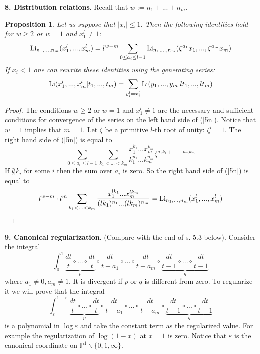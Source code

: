 \documentclass[10pt]{article}
\newtheorem{proposition}[theorem]{Proposition}
\begin{document}
{\bf 8. Distribution relations}. Recall that $w:= n_1 + ... + n_m$. 
\begin{proposition} \label{2.5}
   Let us suppose that  $|x_i| \leq 1$. Then the following identities hold 
for $w\geq 2$ or $w=1$ and $x_1^l \not = 1$:
\begin{equation} \label{5n}
{\rm Li}_{n_{1},...,n_{m}}(x_{1}^l,...,x_{m}^l)   = l^{w-m} \sum_{0 \leq a_i \leq l-1} {\rm Li}_{n_{1},...,n_{m}}(\zeta^{a_1}x_{1},...,\zeta^{a_m}x_{m})   
\end{equation}
If $x_i <1$ one can rewrite these identities using the generating series:
\begin{equation} \label{5n.new}
 {\rm Li} (x^l_{1},...,x^l_{m}|t_{1},...,t_{m})   = 
\sum_{ y^l_i  =  x_i^l} {\rm Li}( y_{1},..., y_{m}|lt_{1},...,lt_{m})   
\end{equation}
\end{proposition}


\begin{proof} The conditions $w\geq 2$ or $w=1$ and $x_1^l \not = 1$ are the necessary and sufficient 
conditions for convergence of the series on the left hand side of (\ref{5n}). 
Notice that $w=1$ implies that $m=1$. 
Let $\zeta$ be a primitive $l$-th root of unity:
$\zeta^l =1$. 
The right hand side of (\ref{5n}) is equal to 
$$
\sum_{0 \leq a_i \leq l-1} \sum_{k_1 < ... < k_m} \frac{x_{1}^{k_{1}}
... x_{m}^{k_{m}}}{k_{1}^{n_{1}}...k_{m}^{n_{m}}}
\zeta^{a_1 k_1 + ... + a_m k_m}
$$
If $l \not|k_i $ for some $i$ then the sum over $a_i$ is zero. So the
right hand side  of (\ref{5n}) is equal to
$$
l^{w-m} \cdot l^m \sum_{k_1 < ... < k_m}\frac{x_{1}^{lk_{1}}
... x_{m}^{lk_{m}}}{(lk_{1})^{n_{1}}...(lk_{m})
^{n_{m}}} = 
{\rm Li}_{n_{1},...,n_{m}}(x_{1}^l,...,x_{m}^l) 
$$


\end{proof}

{\bf 9. Canonical regularization}. (Compare with the end of s. 5.3 below). 
Consider the integral 
\begin{equation} \label{2**reg}
\int_{0}^{1} \underbrace{\frac{dt}{t} \circ ... \circ \frac{dt}{t}}_{p} 
\circ
\frac{dt}{t-a_1} \circ ... \circ 
\frac{dt}{t-a_m} \circ 
\underbrace{\frac{dt}{t-1} \circ ... \circ \frac{dt}{t-1}}_{q}
\end{equation}
where $a_1 \not =  0, a_m \not = 1$.
It is divergent if $p$ or $q$ is different from zero.
To  regularize it we will  prove that the integral
\begin{equation} \label{2*12321}
\int_{\varepsilon}^{1-\varepsilon} \underbrace{\frac{dt}{t} \circ ... \circ \frac{dt}{t}}_{p} 
\circ
\frac{dt}{t-a_1} \circ ... \circ 
\frac{dt}{t-a_m} \circ 
\underbrace{\frac{dt}{t-1} \circ ... \circ \frac{dt}{t-1}}_{q}
\end{equation}
is a polynomial in $\log\varepsilon$ and take the constant term as the regularized value.   
For example the regularization of $\log(1-x)$ at $x=1$ is zero.
Notice that  $\varepsilon$
is the canonical coordinate on ${{\mathbb P}}^1\backslash \{0,1,\infty\}$. 
\end{document}
